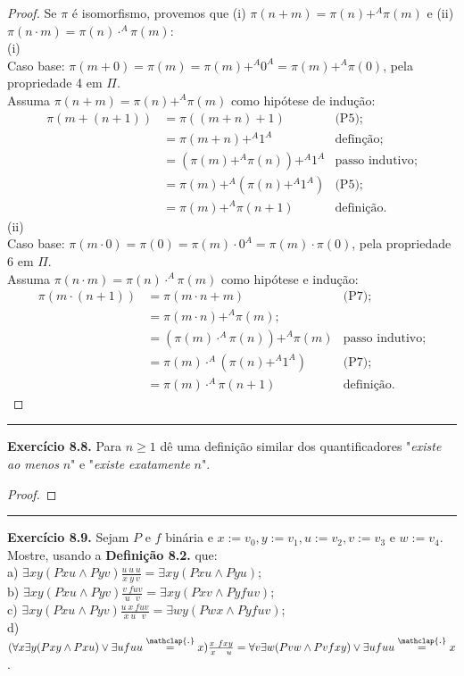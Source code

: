 \documentclass[11pt]{article}
\theoremstyle{definition}
\newcommand\overtext[2]{\stackrel{\mathclap{\normalfont\mbox{#1}}}{#2}}
\begin{document}
\begin{proof}
    Se $\pi$ é isomorfismo, provemos que (i) $\pi(n+m)=\pi(n)+^A\pi(m)$ e (ii) $\pi(n\cdot m)=\pi(n)\cdot^A\pi(m)$:\\
    (i)\\
    Caso base: $\pi(m+0)=\pi(m)=\pi(m)+^A0^A=\pi(m)+^A\pi(0)$, pela propriedade 4 em $\Pi$.\\
    Assuma $\pi(n+m)=\pi(n)+^A\pi(m)$ como hipótese de indução:
    \begin{align*}
        \pi(m+(n+1)) & = \pi((m + n) + 1) & \text{(P5)};\\
        & = \pi(m + n)+^A1^A & \text{definção};\\
        & = (\pi(m)+^A\pi(n))+^A1^A & \text{passo indutivo};\\
        & = \pi(m)+^A(\pi(n)+^A1^A) & \text{(P5)};\\
        & = \pi(m)+^A\pi(n+1) & \text{definição}.
    \end{align*}
    (ii)\\
    Caso base: $\pi(m\cdot0)=\pi(0)=\pi(m)\cdot0^A=\pi(m)\cdot\pi(0)$, pela propriedade 6 em $\Pi$.\\
    Assuma $\pi(n\cdot m)=\pi(n)\cdot^A\pi(m)$ como hipótese e indução:
    \begin{align*}
        \pi(m\cdot(n+1)) & = \pi(m\cdot n + m) & \text{(P7)};\\
        & = \pi(m\cdot n)+^A\pi(m); & \\
        & = (\pi(m)\cdot^A\pi(n))+^A\pi(m) & \text{passo indutivo};\\
        & = \pi(m)\cdot^A(\pi(n)+^A1^A) & \text{(P7)};\\
        & = \pi(m)\cdot^A\pi(n+1) & \text{definição}.
    \end{align*}
\end{proof}

\hrule

\textbf{Exercício 8.8.} Para $n\ge1$ dê uma definição similar dos quantificadores "\textit{existe ao menos }$n$" e "\textit{existe exatamente }$n$".

\begin{proof}
    
\end{proof}

\hrule

\textbf{Exercício 8.9.} Sejam $P$ e $f$ binária e $x:=v_0,y:=v_1,u:=v_2,v:=v_3$ e $w:=v_4$. Mostre, usando a \textbf{Definição 8.2.} que:\\
a) $\exists xy(Pxu\wedge Pyv)\frac{u~u~u}{x~y~v}=\exists xy(Pxu\wedge Pyu)$;\\
b) $\exists xy(Pxu\wedge Pyv)\frac{v~fuv}{u~~~v}=\exists xy(Pxv\wedge Pyfuv)$;\\
c) $\exists xy(Pxu\wedge Pyv)\frac{u~x~fuv}{x~u~~~v}=\exists wy(Pwx\wedge Pyfuv)$;\\
d) $(\forall x\exists y(Pxy\wedge Pxu)\vee\exists ufuu\overtext{.}{=}x)\frac{x~fxy}{x~~~u}=\forall v\exists w(Pvw\wedge Pvfxy)\vee\exists ufuu\overtext{.}{=}x$.
\end{document}
